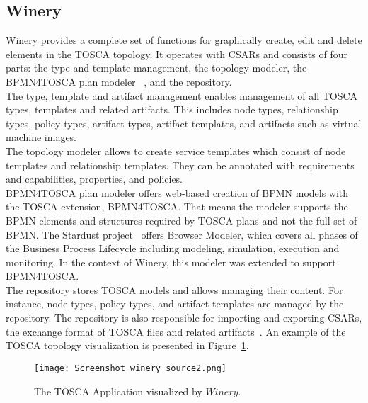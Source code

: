 \subsection*{Winery}\label{subs:wine}\label{tool:winery}
Winery provides a complete set of functions for graphically create, edit and delete elements in the TOSCA topology. 
It operates with CSARs and consists of four parts: the type and template management, the topology modeler, the BPMN4TOSCA plan modeler ~\cite{BPMN4TOSCA}, and the repository.\\
The type, template and artifact management enables management of all TOSCA types, templates and related artifacts. 
This includes node types, relationship types, policy types, artifact types, artifact templates, and artifacts such as virtual machine images.\\
The topology modeler allows to create service templates which consist of node templates and relationship templates. 
They can be annotated with requirements and capabilities, properties, and policies.\\
BPMN4TOSCA plan modeler offers web-based creation of BPMN models with the TOSCA extension, BPMN4TOSCA. 
That means the modeler supports the BPMN elements and structures required by TOSCA plans and not the full set of BPMN. 
The Stardust project~\cite*{stardust} offers Browser Modeler, which covers all phases of the Business Process Lifecycle including modeling, simulation, execution and monitoring. 
In the context of Winery, this modeler was extended to support BPMN4TOSCA.\\
The repository stores TOSCA models and allows managing their content. 
For instance, node types, policy types, and artifact templates are managed by the repository. 
The repository is also responsible for importing and exporting CSARs, the exchange format of TOSCA files and related artifacts~\cite{winery}. %
An example of the TOSCA topology visualization is presented in Figure~\ref{fig:winery_source}.
\begin{figure}[ht]   
\centering
\texttt{[image: Screenshot\_winery\_source2.png]}
\caption{The TOSCA Application visualized by $Winery$.}
\label{fig:winery_source}
\end{figure}
